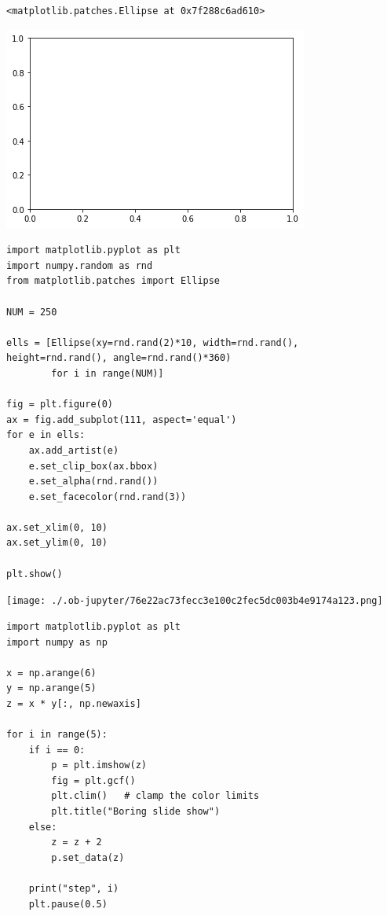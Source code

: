 \documentclass[11pt]{article}
\begin{document}
\begin{verbatim}
<matplotlib.patches.Ellipse at 0x7f288c6ad610>
\end{verbatim}

\begin{center}
\includegraphics[width=.9\linewidth]{./.ob-jupyter/61d2780d035746e2a1d41c3696837d1141c39f65.png}
\end{center}


\begin{verbatim}
import matplotlib.pyplot as plt
import numpy.random as rnd
from matplotlib.patches import Ellipse

NUM = 250

ells = [Ellipse(xy=rnd.rand(2)*10, width=rnd.rand(), height=rnd.rand(), angle=rnd.rand()*360)
        for i in range(NUM)]

fig = plt.figure(0)
ax = fig.add_subplot(111, aspect='equal')
for e in ells:
    ax.add_artist(e)
    e.set_clip_box(ax.bbox)
    e.set_alpha(rnd.rand())
    e.set_facecolor(rnd.rand(3))

ax.set_xlim(0, 10)
ax.set_ylim(0, 10)

plt.show()

\end{verbatim}

\begin{center}
\texttt{[image: ./.ob-jupyter/76e22ac73fecc3e100c2fec5dc003b4e9174a123.png]}
\end{center}


\begin{verbatim}
import matplotlib.pyplot as plt
import numpy as np

x = np.arange(6)
y = np.arange(5)
z = x * y[:, np.newaxis]

for i in range(5):
    if i == 0:
        p = plt.imshow(z)
        fig = plt.gcf()
        plt.clim()   # clamp the color limits
        plt.title("Boring slide show")
    else:
        z = z + 2
        p.set_data(z)

    print("step", i)
    plt.pause(0.5)
\end{verbatim}
\end{document}
